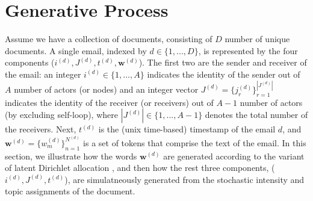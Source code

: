 \documentclass[a4paper]{article}
\begin{document}
\section{Generative Process} \label{sec: Generative Process}
Assume we have a collection of documents, consisting of $D$ number of unique documents. A single email, indexed by $d \in \{1,...,D\}$, is represented by the four components ($i^{(d)}, J^{(d)}, t^{(d)},  \boldsymbol{w}^{(d)}$). The first two are the sender and receiver of the email: an integer $i^{(d)} \in \{1,...,A\}$ indicates the identity of the sender out of $A$ number of actors (or nodes) and an integer vector $J^{(d)} = \{j_r^{(d)}\}_{r=1}^{|J^{(d)}|} $ indicates the identity of the receiver (or receivers) out of $A-1$ number of actors (by excluding self-loop), where $|J^{(d)}|\in \{1,...,A-1\}$ denotes the total number of the receivers. Next, $t^{(d)}$ is the (unix time-based) timestamp of the email $d$, and $\boldsymbol{w}^{(d)} = \{w^{(d)}_m \}_{n=1}^{N^{(d)}}$ is a set of tokens that comprise the text of the email. In this section, we illustrate how the words $\boldsymbol{w}^{(d)}$ are generated according to the variant of latent Dirichlet allocation \citep{Blei2003}, and then how the rest three components, ($i^{(d)}, J^{(d)}, t^{(d)}$), are simulatneously generated from the stochastic intensity and topic assignments of the document.
\end{document}
